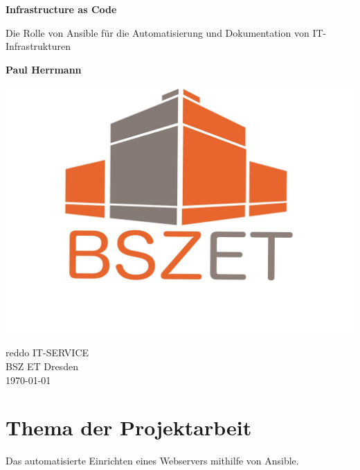 \documentclass[11pt]{article}
\begin{document}
\begin{titlepage}
    \begin{center}
        \vspace*{1cm}
        
        \Huge
        \textbf{Infrastructure as Code}
        
        \Large
        \vspace{0.5cm}
        Die Rolle von Ansible für die Automatisierung und Dokumentation von 
        IT-Infrastrukturen
             
        \vspace{1.5cm}
 
        \textbf{Paul Herrmann}
 
        \vfill
                 
        \vspace{0.8cm}
      
        \includegraphics[width=1\textwidth]{Logo_Schule}
             
        reddo IT-SERVICE\\
        BSZ ET Dresden\\
        \today
             
    \end{center}
 \end{titlepage}

\thispagestyle{empty}
\setcounter{page}{1}

\section{Thema der Projektarbeit}
Das automatisierte Einrichten eines Webservers mithilfe von Ansible.
\end{document}
